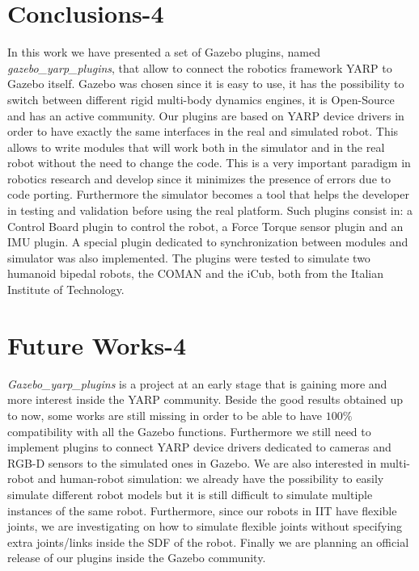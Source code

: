 \section{Conclusions-4}\label{conclusions4}
In this work we have presented a set of Gazebo plugins, named \emph{gazebo\_yarp\_plugins}, that allow to connect the robotics framework YARP to Gazebo itself. Gazebo was chosen since it is easy to use, it has the possibility to switch between different rigid multi-body dynamics engines, it is Open-Source and has an active community. Our plugins are based on YARP device drivers in order to have exactly the same interfaces in the real and simulated robot. This allows to write modules that will work both in the simulator and in the real robot without the need to change the code. This is a very important paradigm in robotics research and develop since it minimizes the presence of errors due to code porting. Furthermore the simulator becomes a tool that helps the developer in testing and validation before using the real platform.
Such plugins consist in: a Control Board plugin to control the robot, a Force Torque sensor plugin and an IMU plugin. A special plugin dedicated to synchronization between modules and simulator was also implemented. The plugins were tested to simulate two humanoid bipedal robots, the COMAN and the iCub, both from the Italian Institute of Technology.


\section{Future Works-4}\label{future_works4}
\emph{Gazebo\_yarp\_plugins} is a project at an early stage that is gaining more and more interest inside the YARP community. Beside the good results obtained up to now, some works are still missing in order to be able to have $100\%$ compatibility with all the Gazebo functions. Furthermore we still need to implement plugins to connect YARP device drivers dedicated to cameras and RGB-D sensors to the simulated ones in Gazebo. We are also interested in multi-robot and human-robot simulation: we already have the possibility to easily simulate different robot models but it is still difficult to simulate multiple instances of the same robot. Furthermore, since our robots in IIT have flexible joints, we are investigating on how to simulate flexible joints without specifying extra joints/links inside the SDF of the robot. 
Finally we are planning an official release of our plugins inside the Gazebo community.





